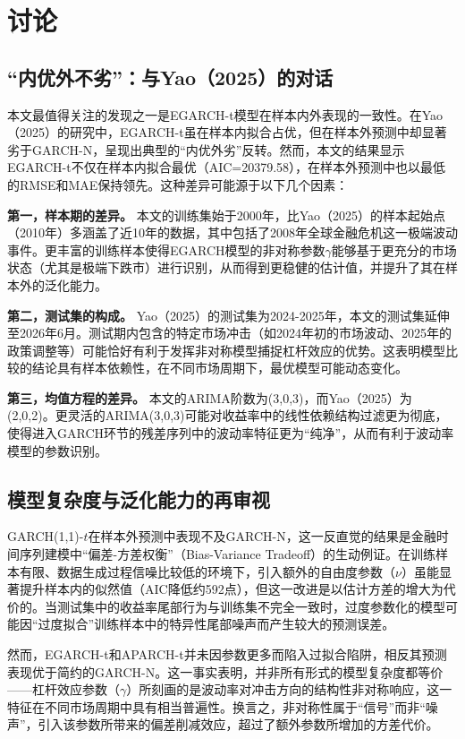 \documentclass[12pt,a4paper]{ctexart}
\begin{document}
\section{讨论}

\subsection{“内优外不劣”：与Yao（2025）的对话}

本文最值得关注的发现之一是EGARCH-t模型在样本内外表现的一致性。在Yao（2025）的研究中，EGARCH-t虽在样本内拟合占优，但在样本外预测中却显著劣于GARCH-N，呈现出典型的“内优外劣”反转。然而，本文的结果显示EGARCH-t不仅在样本内拟合最优（AIC=20379.58），在样本外预测中也以最低的RMSE和MAE保持领先。这种差异可能源于以下几个因素：

\textbf{第一，样本期的差异。} 本文的训练集始于2000年，比Yao（2025）的样本起始点（2010年）多涵盖了近10年的数据，其中包括了2008年全球金融危机这一极端波动事件。更丰富的训练样本使得EGARCH模型的非对称参数$\gamma$能够基于更充分的市场状态（尤其是极端下跌市）进行识别，从而得到更稳健的估计值，并提升了其在样本外的泛化能力。

\textbf{第二，测试集的构成。} Yao（2025）的测试集为2024-2025年，本文的测试集延伸至2026年6月。测试期内包含的特定市场冲击（如2024年初的市场波动、2025年的政策调整等）可能恰好有利于发挥非对称模型捕捉杠杆效应的优势。这表明模型比较的结论具有样本依赖性，在不同市场周期下，最优模型可能动态变化。

\textbf{第三，均值方程的差异。} 本文的ARIMA阶数为(3,0,3)，而Yao（2025）为(2,0,2)。更灵活的ARIMA(3,0,3)可能对收益率中的线性依赖结构过滤更为彻底，使得进入GARCH环节的残差序列中的波动率特征更为“纯净”，从而有利于波动率模型的参数识别。

\subsection{模型复杂度与泛化能力的再审视}

GARCH(1,1)-$t$在样本外预测中表现不及GARCH-N，这一反直觉的结果是金融时间序列建模中“偏差-方差权衡”（Bias-Variance Tradeoff）的生动例证。在训练样本有限、数据生成过程信噪比较低的环境下，引入额外的自由度参数（$\nu$）虽能显著提升样本内的似然值（AIC降低约592点），但这一改进是以估计方差的增大为代价的。当测试集中的收益率尾部行为与训练集不完全一致时，过度参数化的模型可能因“过度拟合”训练样本中的特异性尾部噪声而产生较大的预测误差。

然而，EGARCH-t和APARCH-t并未因参数更多而陷入过拟合陷阱，相反其预测表现优于简约的GARCH-N。这一事实表明，并非所有形式的模型复杂度都等价——杠杆效应参数（$\gamma$）所刻画的是波动率对冲击方向的结构性非对称响应，这一特征在不同市场周期中具有相当普遍性。换言之，非对称性属于“信号”而非“噪声”，引入该参数所带来的偏差削减效应，超过了额外参数所增加的方差代价。
\end{document}
